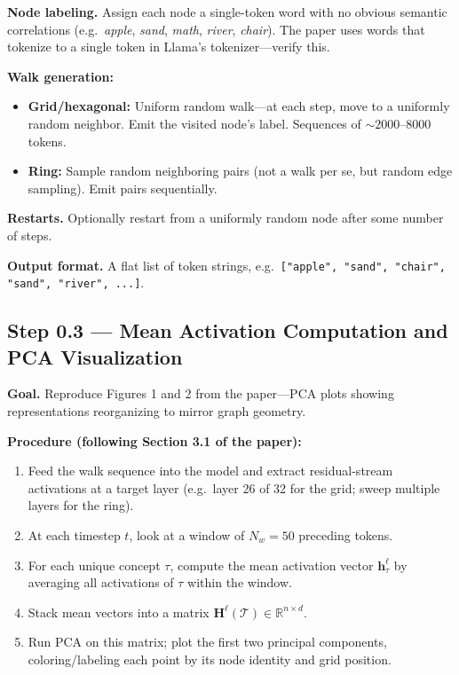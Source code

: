 \documentclass[11pt]{article}
\newcommand{\vH}{\mathbf{H}}
\newcommand{\vh}{\mathbf{h}}
\newcommand{\cT}{\mathcal{T}}
\begin{document}
\textbf{Node labeling.} Assign each node a single-token word with no obvious semantic correlations (e.g.\ \emph{apple}, \emph{sand}, \emph{math}, \emph{river}, \emph{chair}). The paper uses words that tokenize to a single token in Llama's tokenizer---verify this.

\textbf{Walk generation:}
\begin{itemize}
    \item \textbf{Grid/hexagonal:} Uniform random walk---at each step, move to a uniformly random neighbor. Emit the visited node's label. Sequences of ${\sim}2000$--$8000$ tokens.
    \item \textbf{Ring:} Sample random neighboring pairs (not a walk per se, but random edge sampling). Emit pairs sequentially.
\end{itemize}

\textbf{Restarts.} Optionally restart from a uniformly random node after some number of steps.

\textbf{Output format.} A flat list of token strings, e.g.\ \texttt{["apple", "sand", "chair", "sand", "river", ...]}.

\subsection{Step 0.3 --- Mean Activation Computation and PCA Visualization}

\textbf{Goal.} Reproduce Figures 1 and 2 from the paper---PCA plots showing representations reorganizing to mirror graph geometry.

\textbf{Procedure (following Section 3.1 of the paper):}
\begin{enumerate}
    \item Feed the walk sequence into the model and extract residual-stream activations at a target layer (e.g.\ layer 26 of 32 for the grid; sweep multiple layers for the ring).
    \item At each timestep $t$, look at a window of $N_w = 50$ preceding tokens.
    \item For each unique concept $\tau$, compute the mean activation vector $\vh_\tau^\ell$ by averaging all activations of $\tau$ within the window.
    \item Stack mean vectors into a matrix $\vH^\ell(\cT) \in \mathbb{R}^{n \times d}$.
    \item Run PCA on this matrix; plot the first two principal components, coloring/labeling each point by its node identity and grid position.
\end{enumerate}
\end{document}
